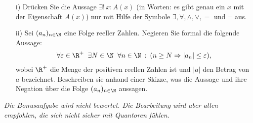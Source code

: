\begin{itemize}
    \item[i)] Drücken Sie die Aussage $\exists! \,x : A(x)$ (in Worten: es gibt genau ein
    $x$ mit der Eigenschaft $A(x)$) nur mit Hilfe der Symbole
        $\exists,\forall,\land, \lor, =$ und $\neg$ aus.

    \item[ii)] Sei $(a_n)_{n \in  \N}$ eine Folge reeller Zahlen. Negieren Sie formal die folgende Aussage:
\begin{align*}
    \forall \varepsilon \in \R^+ \;\;\exists N \in \N \;\; \forall n \in \N \::\: (n \geq N
    \Rightarrow |a_n|\leq \varepsilon),
\end{align*}
wobei $\R^+$ die Menge der positiven reellen Zahlen ist und $|a|$ den Betrag
von $a$ bezeichnet. Beschreiben sie anhand einer Skizze, was die Aussage und
        ihre Negation über die Folge $(a_n)_{n \in \N}$ aussagen.
\end{itemize}
\textit{Die Bonusaufgabe wird nicht bewertet. Die Bearbeitung wird aber allen
empfohlen, die sich nicht sicher mit Quantoren fühlen.}

